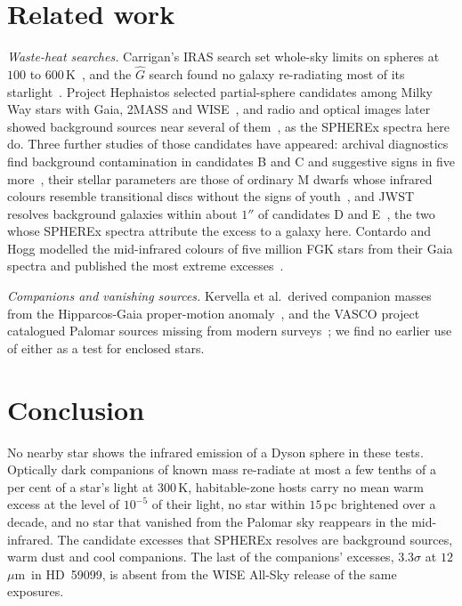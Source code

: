 \documentclass[3p,11pt]{elsarticle}
\newcommand{\um}{\,$\mu$m}
\begin{document}
\section{Related work}\label{sec:related}

\emph{Waste-heat searches.} Carrigan's IRAS search set whole-sky limits on spheres at
$100$ to $600$\,K~\cite{Carrigan2009}, and the $\hat{G}$ search found no galaxy
re-radiating most of its starlight~\cite{Wright2014,Griffith2015}. Project Hephaistos
selected partial-sphere candidates among Milky Way stars with Gaia, 2MASS and
WISE~\cite{Suazo2022,Suazo2024}, and radio and optical images later showed background
sources near several of them~\cite{Ren2024}, as the SPHEREx spectra here do. Three
further studies of those candidates have appeared: archival diagnostics find
background contamination in candidates B and C and suggestive signs in five
more~\cite{Ren2026}, their stellar parameters are those of ordinary M dwarfs whose
infrared colours resemble transitional discs without the signs of
youth~\cite{Korn2026}, and JWST resolves background galaxies within about $1''$ of
candidates D and E~\cite{Zackrisson2026}, the two whose SPHEREx spectra attribute the
excess to a galaxy here. Contardo and
Hogg modelled the mid-infrared colours of five million FGK stars from their Gaia spectra
and published the most extreme excesses~\cite{Contardo2024}.

\emph{Companions and vanishing sources.} Kervella et al.\ derived companion masses from
the Hipparcos-Gaia proper-motion anomaly~\cite{Kervella2022}, and the VASCO project
catalogued Palomar sources missing from modern surveys~\cite{Villarroel2020,Solano2022};
we find no earlier use of either as a test for enclosed stars.

\section{Conclusion}\label{sec:conclusion}

No nearby star shows the infrared emission of a Dyson sphere in these tests. Optically
dark companions of known mass re-radiate at most a few tenths of a per cent of a star's
light at $300$\,K, habitable-zone hosts carry no mean warm excess at the level of
$10^{-5}$ of their light, no star within $15$\,pc brightened over a decade, and no star
that vanished from the Palomar sky reappears in the mid-infrared. The candidate
excesses that SPHEREx resolves are background sources, warm dust and cool companions.
The last of the companions' excesses, $3.3\sigma$ at $12$\um\ in HD~59099, is absent
from the WISE All-Sky release of the same exposures.
\end{document}
